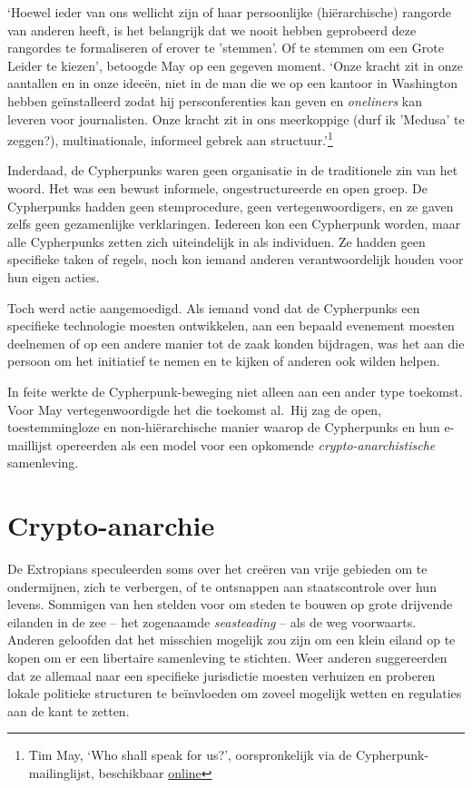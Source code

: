 \documentclass[smalldemyvopaper,11pt,twoside,onecolumn,openright,extrafontsizes,hidelinks]{memoir}
\begin{document}
`Hoewel ieder van ons wellicht zijn of haar persoonlijke (hiërarchische)
rangorde van anderen heeft, is het belangrijk dat we nooit hebben
geprobeerd deze rangordes te formaliseren of erover te 'stemmen'. Of te
stemmen om een Grote Leider te kiezen', betoogde May op een gegeven
moment. `Onze kracht zit in onze aantallen en in onze ideeën, niet in de
man die we op een kantoor in Washington hebben geïnstalleerd zodat hij
persconferenties kan geven en \emph{oneliners} kan leveren voor
journalisten. Onze kracht zit in ons meerkoppige (durf ik 'Medusa' te
zeggen?), multinationale, informeel gebrek aan structuur.'\footnote{Tim
  May, `Who shall speak for us?', oorspronkelijk via de
  Cypherpunk-mailinglijst, beschikbaar
  \href{https://cypherpunks.venona.com/date/1995/09/msg02189.html}{online}}

Inderdaad, de Cypherpunks waren geen organisatie in de traditionele zin
van het woord. Het was een bewust informele, ongestructureerde en open
groep. De Cypherpunks hadden geen stemprocedure, geen
vertegenwoordigers, en ze gaven zelfs geen gezamenlijke verklaringen.
Iedereen kon een Cypherpunk worden, maar alle Cypherpunks zetten zich
uiteindelijk in als individuen. Ze hadden geen specifieke taken of
regels, noch kon iemand anderen verantwoordelijk houden voor hun eigen
acties.

Toch werd actie aangemoedigd. Als iemand vond dat de Cypherpunks een
specifieke technologie moesten ontwikkelen, aan een bepaald evenement
moesten deelnemen of op een andere manier tot de zaak konden bijdragen,
was het aan die persoon om het initiatief te nemen en te kijken of
anderen ook wilden helpen.

In feite werkte de Cypherpunk-beweging niet alleen aan een ander type
toekomst. Voor May vertegenwoordigde het die toekomst al.~Hij zag de
open, toestemmingloze en non-hiërarchische manier waarop de Cypherpunks
en hun e-maillijst opereerden als een model voor een opkomende
\emph{crypto-anarchistische} samenleving.

\section{Crypto-anarchie}\label{crypto-anarchie}

De Extropians speculeerden soms over het creëren van vrije gebieden om
te ondermijnen, zich te verbergen, of te ontsnappen aan staatscontrole
over hun levens. Sommigen van hen stelden voor om steden te bouwen op
grote drijvende eilanden in de zee -- het zogenaamde \emph{seasteading}
-- als de weg voorwaarts. Anderen geloofden dat het misschien mogelijk
zou zijn om een klein eiland op te kopen om er een libertaire
samenleving te stichten. Weer anderen suggereerden dat ze allemaal naar
een specifieke jurisdictie moesten verhuizen en proberen lokale
politieke structuren te beïnvloeden om zoveel mogelijk wetten en
regulaties aan de kant te zetten.
\end{document}
